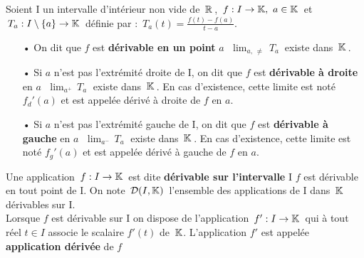 Soient I un intervalle d'intérieur non vide de $\,\mathbb{R}\,$, \(\,f:I\to \mathbb{K},\ a\in \mathbb{K}\,\) et \(\,T_a:I\setminus \{a\}\to \mathbb{K}\,\) définie par : \(\,\displaystyle T_a(t)=\frac{f(t)-f(a)}{t-a}.\)\vspace{0.1cm}
\begin{itemize}[leftmargin=1cm]
    \item[•] On dit que $f$ est \textbf{dérivable en un point} $a$ \ssi \(\;\displaystyle \lim_{a,\,\neq}\,T_a\:\) existe dans $\,\mathbb{K}\,$.
    
    \item[•] Si $a$ n'est pas l'extrémité droite de I, on dit que $f$ est \textbf{dérivable à droite} en $a$ \ssi \(\;\displaystyle \lim_{a^+}\,T_a\;\) existe dans $\,\mathbb{K}\,$. En cas d'existence, cette limite est noté \(f_d'(a)\) et est appelée dérivé à droite de $f$ en $a$.
    
    \item[•] Si $a$ n'est pas l'extrémité gauche de I, on dit que $f$ est \textbf{dérivable à gauche} en $a$ \ssi \(\;\displaystyle \lim_{a^-}\,T_a\;\) existe dans $\,\mathbb{K}\,$. En cas d'existence, cette limite est noté \(f_g'(a)\) et est appelée dérivé à gauche de $f$ en $a$.
\end{itemize}

\vspace{1cm}

Une application \(\,f:I\to \mathbb{K}\,\) est dite \textbf{dérivable sur l'intervalle} I \ssi $f$ est dérivable en tout point de I. On note \(\,\mathcal{D}(I,\mathbb{K})\,\) l'ensemble des applications de I dans $\,\mathbb{K}\,$ dérivables sur I.\\
Lorsque $f$ est dérivable sur I on dispose de l'application \(\, f':I\to \mathbb{K}\,\) qui à tout réel \(t\in I\) associe le scalaire \(f'(t)\) de \(\,\mathbb{K}\). L'application $f'$ est appelée \textbf{application dérivée} de $f$

\vspace{1.3cm}

